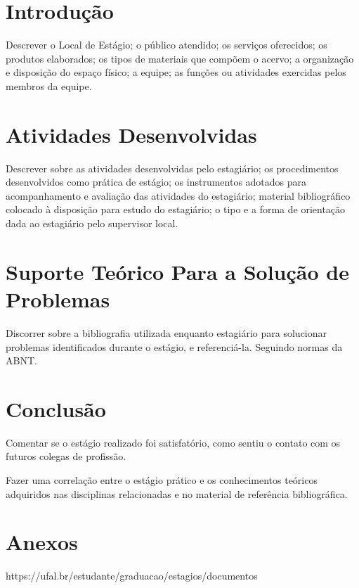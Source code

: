 \documentclass{myreport}
\begin{document}
\capa
\folhaDeRosto
{}
\newpage
\tableofcontents
\newpage
\inicio
\chapter{Introdução}
Descrever o Local de Estágio; o público atendido; os serviços oferecidos; os produtos elaborados; os tipos de materiais que compõem o acervo; a organização e disposição do espaço físico; a equipe; as funções ou atividades exercidas pelos membros da equipe.

\chapter{Atividades Desenvolvidas}
Descrever sobre as atividades desenvolvidas pelo estagiário; os procedimentos desenvolvidos como prática de estágio; os instrumentos adotados para acompanhamento e avaliação das atividades do estagiário; material bibliográfico colocado à disposição para estudo do estagiário; o tipo e a forma de orientação dada ao estagiário pelo supervisor local.

\chapter{Suporte Teórico Para a Solução de Problemas}
Discorrer sobre a bibliografia utilizada enquanto estagiário para solucionar problemas identificados durante o estágio, e referenciá-la. Seguindo normas da ABNT.

\chapter{Conclusão}
Comentar se o estágio realizado foi satisfatório, como sentiu o contato com os futuros colegas de profissão.

Fazer uma correlação entre o estágio prático e os conhecimentos teóricos adquiridos nas disciplinas relacionadas e no material de referência bibliográfica.


\chapter{Anexos}
https://ufal.br/estudante/graduacao/estagios/documentos\cite{UFAL}
\end{document}
